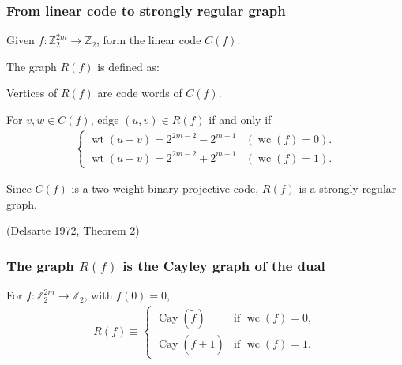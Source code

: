 \documentclass[pdf,sprung,slideColor,nocolorBG]{beamer}
\newcommand{\slidecite}[1]{\tiny{(#1)}\normalsize{}}
\newcommand{\mb}[1]{\mathbb{#1}}
\newcommand{\To}{\rightarrow}
\newcommand{\Cay}[1]{\operatorname{Cay}\left(#1\right)}
\newcommand{\dual}[1]{\widetilde{#1}}
\newcommand{\weight}[1]{\operatorname{wt}\left(#1\right)}
\newcommand{\weightclass}[1]{\operatorname{wc}\left(#1\right)}
\newcommand{\Z}{\mb{Z}}
\begin{document}
\begin{frame}
\frametitle{From linear code to strongly regular graph}
\begin{Definition}

Given $f : \Z_2^{2m} \To \Z_2$, form the linear code $C(f)$.

The graph $R(f)$ is defined as:

Vertices of $R(f)$ are code words of $C(f)$.

For $v,w \in C(f)$, edge $(u,v) \in R(f)$ if and only if
\begin{align*}
\begin{cases}
\weight{u+v} = 2^{2m-2} - 2^{m-1} & (\weightclass{f}=0).
\\
\weight{u+v} = 2^{2m-2} + 2^{m-1} & (\weightclass{f}=1).
\end{cases}
\end{align*}
 
\end{Definition}
Since $C(f)$ is a two-weight binary projective code, 
$R(f)$ is a strongly regular graph.
 
\slidecite{Delsarte 1972, Theorem 2}
\end{frame}
\begin{frame}
\frametitle{The graph $R(f)$ is the Cayley graph of the dual}

\begin{Theorem}
For $f : \Z_2^{2m} \To \Z_2$, with $f(0)=0$,
\begin{align*}
R(f) \equiv 
\begin{cases}
\Cay{\dual{f}} & \text{if~} \weightclass{f}=0,
\\
\Cay{\dual{f}+1} & \text{if~} \weightclass{f}=1.
\end{cases}
\end{align*}
 
\end{Theorem}
\end{frame}
\end{document}
